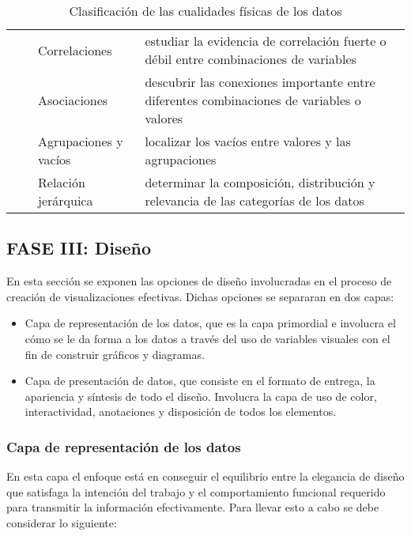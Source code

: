 {\begin{landscape}
\begin{table}
\begin{tabular}{ | l | l | l | p{10cm} |}
  \cline{3-4}
  &   & Correlaciones & estudiar la evidencia de correlación fuerte o débil entre combinaciones de variables \\
  \cline{3-4}
  &   & Asociaciones & descubrir las conexiones importante entre diferentes combinaciones de variables o valores \\
  \cline{3-4}
  &   & Agrupaciones y vacíos & localizar los vacíos entre valores y las agrupaciones \\
  \cline{3-4}
  &   & Relación jerárquica & determinar la composición, distribución y relevancia de las categorías de los datos \\
  \hline
  \end{tabular}
  \caption[Clasificación de las cualidades físicas de los datos]{Clasificación de las cualidades físicas de los datos}
  \label{table:tb1}
\end{table}
\end{landscape}
}

\subsection{FASE III: Diseño}
En esta sección se exponen las opciones de diseño involucradas en el proceso de creación de visualizaciones efectivas. Dichas opciones se separaran en dos capas:

\begin{itemize}
  \item Capa de representación de los datos, que es la capa primordial e involucra el cómo se le da forma a los datos a través del uso de variables visuales con el fin de construir gráficos y diagramas. 
  \item Capa de presentación de datos, que consiste en el formato de entrega, la apariencia y síntesis de todo el diseño. Involucra la capa de uso de color, interactividad, anotaciones y disposición de todos los elementos.
\end{itemize}

\subsubsection{Capa de representación de los datos}

En esta capa el enfoque está en conseguir el equilibrio entre la elegancia de diseño que satisfaga la intención del trabajo y el comportamiento funcional requerido para transmitir la información efectivamente. Para llevar esto a cabo se debe considerar lo siguiente:

